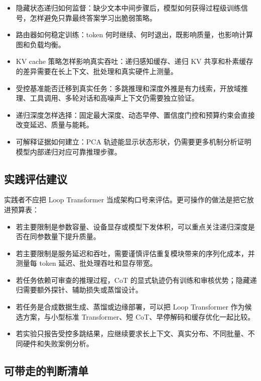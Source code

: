 ﻿\documentclass[a4paper]{article}
\begin{document}
\begin{itemize}
  \item 隐藏状态递归如何监督：缺少文本中间步骤后，模型如何获得过程级训练信号，怎样避免只靠最终答案学习出脆弱策略。
  \item 路由器如何稳定训练：token 何时继续、何时退出，既影响质量，也影响计算图和负载均衡。
  \item KV cache 策略怎样影响真实吞吐：递归感知缓存、递归 KV 共享和朴素缓存的差异需要在长上下文、批处理和真实硬件上测量。
  \item 受控基准能否迁移到真实任务：多跳推理和深度外推是有力线索，开放域推理、工具调用、多轮对话和高噪声上下文仍需要独立验证。
  \item 递归深度怎样选择：固定最大深度、动态早停、置信度门控和预算约束会直接改变延迟、质量与能耗。
  \item 可解释证据如何建立：PCA 轨迹能显示状态形状，仍需要更多机制分析证明模型内部递归对应可靠推理步骤。
\end{itemize}

\subsection{实践评估建议}

实践者不应把 Loop Transformer 当成架构口号来评估。更可操作的做法是把它放进预算表：

\begin{itemize}
  \item 若主要限制是参数容量、设备显存或模型下发体积，可以重点关注递归深度是否在同参数量下提升质量。
  \item 若主要限制是服务延迟和吞吐，需要谨慎评估重复模块带来的序列化成本，并测量每 token 延迟、批处理吞吐和显存带宽。
  \item 若任务依赖可审查的推理过程，CoT 的显式轨迹仍有训练和审核优势；隐藏递归需要额外探针、辅助损失或蒸馏设计。
  \item 若任务是合成数据生成、蒸馏或边缘部署，可以把 Loop Transformer 作为候选方案，与小型标准 Transformer、短 CoT、早停解码和缓存优化一起比较。
  \item 若实验只报告受控多跳结果，应继续要求长上下文、真实分布、不同批量、不同硬件和失败案例分析。
\end{itemize}

\subsection{可带走的判断清单}
\end{document}
